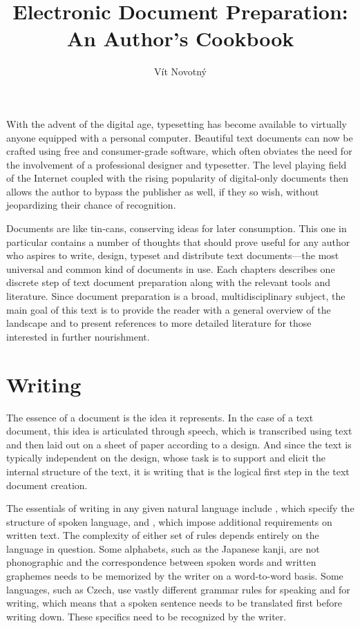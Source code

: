 \documentclass{book}
\begin{document}
\frontmatter
\title{Electronic Document Preparation: An Author's Cookbook}
\author{Vít Novotný}
\maketitle
\tableofcontents
\mainmatter

With the advent of the digital age, typesetting has become available to
virtually anyone equipped with a personal computer. Beautiful text documents can
now be crafted using free and consumer-grade software, which often obviates the
need for the involvement of a professional designer and typesetter. The level
playing field of the Internet coupled with the rising popularity of digital-only
documents then allows the author to bypass the publisher as well, if they so
wish, without jeopardizing their chance of recognition.

Documents are like tin-cans, conserving ideas for later consumption. This one in
particular contains a number of thoughts that should prove useful for any author
who aspires to write, design, typeset and distribute text documents---the most
universal and common kind of documents in use. Each chapters describes one
discrete step of text document preparation along with the relevant tools and
literature. Since document preparation is a broad, multidisciplinary subject,
the main goal of this text is to provide the reader with a general overview of
the landscape and to present references to more detailed literature for those
interested in further nourishment.

\chapter{Writing}
The essence of a document is the idea it represents. In the case of a text
document, this idea is articulated through speech, which is transcribed using
text and then laid out on a sheet of paper according to a design. And since the
text is typically independent on the design, whose task is to support and elicit
the internal structure of the text, it is writing that is the logical first step
in the text document creation.


The essentials of writing in any given natural language include , which specify the structure of spoken language, and , which impose additional requirements on written text. The complexity of
either set of rules depends entirely on the language in question. Some
alphabets, such as the Japanese kanji, are not phonographic and the
correspondence between spoken words and written graphemes needs to be memorized
by the writer on a word-to-word basis. Some languages, such as Czech, use vastly
different grammar rules for speaking and for writing, which means that a spoken
sentence needs to be translated first before writing down. These specifics need
to be recognized by the writer.
\end{document}
